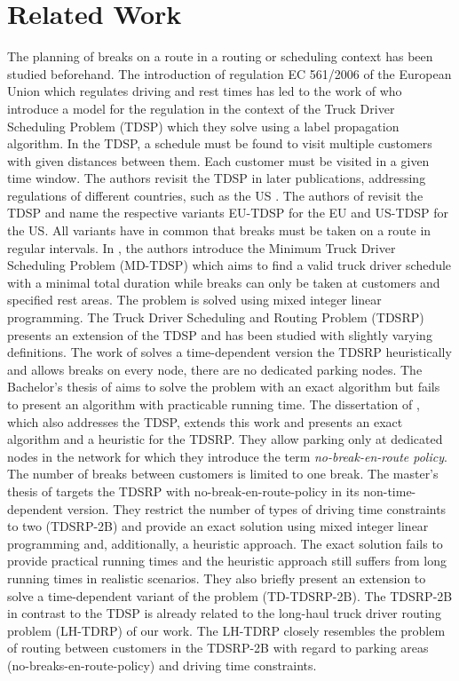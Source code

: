 
\chapter{Related Work\label{ch:related_work}}
The planning of breaks on a route in a routing or scheduling context has been studied beforehand. The introduction of regulation EC 561/2006 of the European Union \cite{europeanparliament:2006} which regulates driving and rest times has led to the work of \cite{goel:2009} who introduce a model for the regulation in the context of the Truck Driver Scheduling Problem (TDSP) which they solve using a label propagation algorithm. In the TDSP, a schedule must be found to visit multiple customers with given distances between them. Each customer must be visited in a given time window. The authors revisit the TDSP in later publications, addressing regulations of different countries, such as the US \cite{goel:2012}. The authors of \cite{sartori:20210107} revisit the TDSP and name the respective variants EU-TDSP for the EU and US-TDSP for the US. All variants have in common that breaks must be taken on a route in regular intervals. In \cite{goel:2012a}, the authors introduce the Minimum Truck Driver Scheduling Problem (MD-TDSP) which aims to find a valid truck driver schedule with a minimal total duration while breaks can only be taken at customers and specified rest areas. The problem is solved using mixed integer linear programming. The Truck Driver Scheduling and Routing Problem (TDSRP) presents an extension of the TDSP and has been studied with slightly varying definitions. The work of \cite{shah:2008} solves a time-dependent version the TDSRP heuristically and allows breaks on every node, there are no dedicated parking nodes. The Bachelor's thesis of \cite{braeuer:2016} aims to solve the problem with an exact algorithm but fails to present an algorithm with practicable running time. The dissertation of \cite{kleff:2019}, which also addresses the TDSP, extends this work and presents an exact algorithm and a heuristic for the TDSRP. They allow parking only at dedicated nodes in the network for which they introduce the term \emph{no-break-en-route policy}. The number of breaks between customers is limited to one break. The master's thesis of \cite{bomsdorf:2020} targets the TDSRP with no-break-en-route-policy in its non-time-dependent version. They restrict the number of types of driving time constraints to two (TDSRP-2B) and provide an exact solution using mixed integer linear programming and, additionally, a heuristic approach. The exact solution fails to provide practical running times and the heuristic approach still suffers from long running times in realistic scenarios. They also briefly present an extension to solve a time-dependent variant of the problem (TD-TDSRP-2B). The TDSRP-2B in contrast to the TDSP is already related to the long-haul truck driver routing problem (LH-TDRP) of our work. The LH-TDRP closely resembles the problem of routing between customers in the TDSRP-2B with regard to parking areas (no-breaks-en-route-policy) and driving time constraints.

